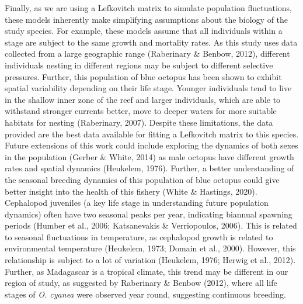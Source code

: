 \documentclass[
  12pt,
]{article}
\begin{document}
Finally, as we are using a Lefkovitch matrix to simulate population fluctuations, these models inherently make simplifying assumptions about the biology of the study species. For example, these models assume that all individuals within a stage are subject to the same growth and mortality rates. As this study uses data collected from a large geographic range (Raberinary \& Benbow, 2012), different individuals nesting in different regions may be subject to different selective pressures. Further, this population of blue octopus has been shown to exhibit spatial variability depending on their life stage. Younger individuals tend to live in the shallow inner zone of the reef and larger individuals, which are able to withstand stronger currents better, move to deeper waters for more suitable habitats for nesting (Raberinary, 2007). Despite these limitations, the data provided are the best data available for fitting a Lefkovitch matrix to this species. Future extensions of this work could include exploring the dynamics of both sexes in the population (Gerber \& White, 2014) as male octopus have different growth rates and spatial dynamics (Heukelem, 1976). Further, a better understanding of the seasonal breeding dynamics of this population of blue octopus could give better insight into the health of this fishery (White \& Hastings, 2020). Cephalopod juveniles (a key life stage in understanding future population dynamics) often have two seasonal peaks per year, indicating biannual spawning periods (Humber et al., 2006; Katsanevakis \& Verriopoulos, 2006). This is related to seasonal fluctuations in temperature, as cephalopod growth is related to environmental temperature (Heukelem, 1973; Domain et al., 2000). However, this relationship is subject to a lot of variation (Heukelem, 1976; Herwig et al., 2012). Further, as Madagascar is a tropical climate, this trend may be different in our region of study, as suggested by Raberinary \& Benbow (2012), where all life stages of \emph{O. cyanea} were observed year round, suggesting continuous breeding.
\end{document}
